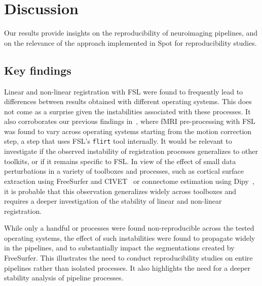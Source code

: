 \documentclass[a4paper,num-refs]{oup-contemporary}
\newcommand{\toolname}[0]{Spot\xspace}
\newcommand{\flirt}[0]{\texttt{flirt}\xspace}
\begin{document}


\section{Discussion}

Our results provide insights on the reproducibility of
neuroimaging pipelines, and on the relevance of the approach implemented
in \toolname for reproducibility studies.

\subsection{Key findings}
Linear and non-linear registration with FSL were found to
frequently lead to differences between results obtained with different
operating systems. This does not come as a surprise given the instabilities
associated with these processes. It also corroborates our previous findings
in~\cite{Glatard2015}, where fMRI pre-processing with FSL was found to vary across operating systems
starting from the motion
correction step, a step that uses FSL's \flirt tool internally. It
would be relevant to investigate if the observed instability of
registration processes generalizes to other toolkits, or if it remains specific
to FSL. In view of the effect of small data perturbations in a variety of
toolboxes and processes, such as cortical surface extraction using
FreeSurfer and CIVET~\cite{Lewis2017-ll} or connectome estimation using
Dipy~\cite{kiar2020comparing}, it is probable that this observation
generalizes widely across toolboxes and requires a deeper investigation of
the stability of linear and non-linear registration.

While only a handful or processes were found non-reproducible across the
tested operating systems, the effect of such instabilities were found to
propagate widely in the pipelines, and to substantially impact the segmentations
created by FreeSurfer. This illustrates the need to conduct reproducibility studies
on entire pipelines rather than isolated processes. It also highlights the need
for a deeper stability analysis of pipeline processes.
\end{document}
